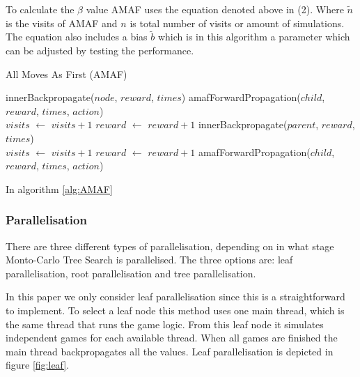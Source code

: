 \documentclass{ba-kecs}
\begin{document}
To calculate the $\beta$ value AMAF uses the equation denoted above in (2). Where $\tilde{n}$ is the visits of AMAF and $n$ is total number of visits or amount of simulations. The equation also includes a bias $\tilde{b}$ which is in this algorithm a parameter which can be adjusted by testing the performance. \cite{gelly2011monte}

\begin{algorithm}
	\caption{All Moves As First (AMAF)}
	\label{alg:AMAF}
	\begin{algorithmic}
		\State innerBackpropagate($node$, $reward$, $times$)
		\State amafForwardPropagation($child$, $reward$, $times$, $action$)
		\EndFor\label{}
		\EndFunction \\
		
		\State $visits$ $\leftarrow$ $visits + 1$
		\State $reward$ $\leftarrow$ $reward + 1$
			\State innerBackpropagate($parent$, $reward$, $times$)
		\EndIf
		\EndFunction \\
		
			\State $visits$ $\leftarrow$ $visits + 1$
			\State $reward$ $\leftarrow$ $reward + 1$
		\Else
				\State amafForwardPropagation($child$, $reward$, $times$, $action$)
			\EndFor
		\EndIf
		\EndFunction
	\end{algorithmic}
\end{algorithm}

In algorithm \ref{alg:AMAF}




\subsubsection{Parallelisation}
There are three different types of parallelisation, depending on in what stage Monto-Carlo Tree Search is parallelised. The three options are: leaf parallelisation, root parallelisation and tree parallelisation. 

In this paper we only consider leaf parallelisation since this is a straightforward to implement. To select a leaf node this method uses one main thread, which is the same thread that runs the game logic. From this leaf node it simulates independent games for each available thread. When all games are finished the main thread backpropagates all the values.\cite{chaslot2008parallel} Leaf parallelisation is depicted in figure \ref{fig:leaf}.
\end{document}
